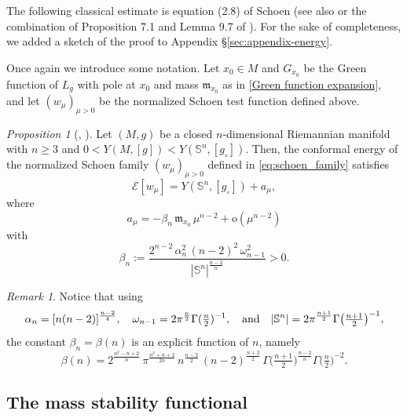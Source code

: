 \documentclass[reqno,11pt]{amsart}
\numberwithin{equation}{section}
\theoremstyle{definition}
\theoremstyle{remark}
\newtheorem{remark}[theorem]{Remark}
\newtheorem{propositionletter}[theoremletter]{Proposition}
\newcommand{\Ss}{\mathbb{S}}
\begin{document}
The following classical estimate is equation (2.8) of Schoen \cite{Sch1} (see 
also \cite{Schoen1989} or the combination of Proposition 7.1 and Lemma 9.7 of \cite{LP}). For 
the sake of completeness, we added a sketch of the proof to Appendix \S\ref{sec:appendix-energy}.

Once again we introduce some notation.
Let $x_0 \in M$ and $G_{x_0}$ be the Green function of $L_g$ with pole at $x_0$ and mass 
$\mathfrak{m}_{x_0}$ as in \eqref{Green function expansion}, and let $(w_\mu)_{\mu>0}$ 
be the normalized Schoen test function defined above.

\begin{propositionletter}[{\cite{Sch1}}, {\cite{Schoen1989}}]
\label{prop:schoen-energy}
Let $(M, g)$ be a closed $n$-dimensional Riemannian manifold with $n \geqslant 3$ 
and $0 < Y(M,[g]) < Y(\Ss^n,[g_\circ])$.
Then, the conformal energy of the normalized Schoen family $(w_\mu)_{\mu>0}$ defined 
in \eqref{eq:schoen_family} satisfies
\[
\mathcal{E}[w_\mu] = Y(\Ss^n,[g_\circ]) + a_\mu,
\]
where
\begin{equation}
\label{eq:schoen-energy}
a_\mu = -\beta_n\, \mathfrak{m}_{x_0}\, \mu^{n-2} + \mathrm{o}(\mu^{n-2})
\end{equation}
with
\begin{equation}
\label{eq:beta-def}
\beta_n :=\frac{2^{n-2}\,\alpha_n^2\,(n-2)^2\,\omega_{n-1}^2}{|\Ss^n|^{\frac{n-2}{n}}} > 0.
\end{equation}
\end{propositionletter}

\begin{remark}\label{rmk:beta-explicit}
Notice that using 
\[\alpha_n = [n(n-2)]^{\frac{n-2}{4}}, \quad \omega_{n-1} = {2\pi^{\frac{n}{2}}}{\Gamma(\tfrac{n}{2})^{-1}}, \quad {\rm and} \quad |\Ss^n| = {2\pi^{\frac{n+1}{2}}}{\Gamma\!\left(\tfrac{n+1}{2}\right)^{-1}},
\]
the constant $\beta_n=\beta(n)$ is an explicit function of $n$, namely
\begin{equation}
\label{eq:beta-gamma}
\beta(n) = 2^{\frac{n^2-n+2}{n}}\,\pi^{\frac{n^2+n+2}{2n}}\,n^{\frac{n-2}{2}}\,(n-2)^{\frac{n+2}{2}}\,\Gamma\!\bigl(\tfrac{n+1}{2}\bigr)^{\frac{n-2}{n}}{\Gamma\!\bigl(\tfrac{n}{2}\bigr)^{-2}}.
\end{equation}
\end{remark}

\subsection{The mass stability functional}
\end{document}
